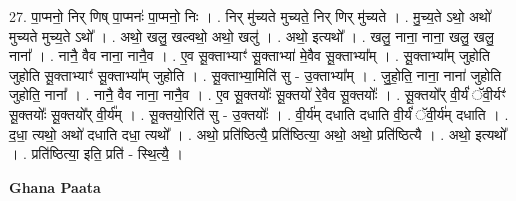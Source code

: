 \documentclass[17pt]{extarticle}
\begin{document}
27. पा॒प्मनो॒ निर् णिष् पा॒प्मनः॑ पा॒प्मनो॒ निः । . निर् मु॑च्यते मुच्यते॒ निर् णिर् मु॑च्यते । . मु॒च्य॒ते ऽथो॒ अथो॑ मुच्यते मुच्य॒ते ऽथो᳚ । . अथो॒ खलु॒ खल्वथो॒ अथो॒ खलु॑ । . अथो॒ इत्यथो᳚ । . खलु॒ नाना॒ नाना॒ खलु॒ खलु॒ नाना᳚ । . नानै॒ वैव नाना॒ नानै॒व । . ए॒व सू॒क्ताभ्याꣳ॑ सू॒क्ताभ्या॑ मे॒वैव सू॒क्ताभ्या᳚म् । . सू॒क्ताभ्या᳚म् जुहोति जुहोति सू॒क्ताभ्याꣳ॑ सू॒क्ताभ्या᳚म् जुहोति । . सू॒क्ताभ्या॒मिति॑ सु - उ॒क्ताभ्या᳚म् । . जु॒हो॒ति॒ नाना॒ नाना॑ जुहोति जुहोति॒ नाना᳚ । . नानै॒ वैव नाना॒ नानै॒व । . ए॒व सू॒क्तयोः᳚ सू॒क्तयो॑ रे॒वैव सू॒क्तयोः᳚ । . सू॒क्तयो᳚र् वी॒र्यं॑ ॅवी॒र्यꣳ॑ सू॒क्तयोः᳚ सू॒क्तयो᳚र् वी॒र्य᳚म् । . सू॒क्तयो॒रिति॑ सु - उ॒क्तयोः᳚ । . वी॒र्य॑म् दधाति दधाति वी॒र्यं॑ ॅवी॒र्य॑म् दधाति । . द॒धा॒ त्यथो॒ अथो॑ दधाति दधा॒ त्यथो᳚ । . अथो॒ प्रति॑ष्ठित्यै॒ प्रति॑ष्ठित्या॒ अथो॒ अथो॒ प्रति॑ष्ठित्यै । . अथो॒ इत्यथो᳚ । . प्रति॑ष्ठित्या॒ इति॒ प्रति॑ - स्थि॒त्यै॒ । \newline

\textbf{Ghana Paata } \newline
\end{document}
